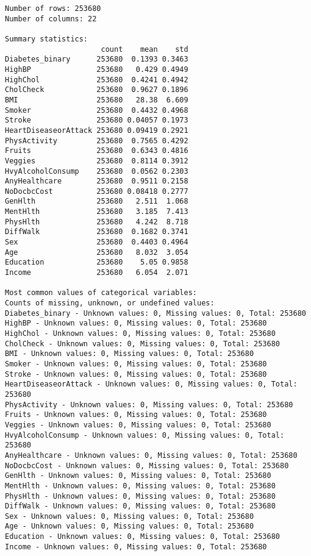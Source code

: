 \documentclass[11pt]{article}
\begin{document}
\begin{Verbatim}[tabsize=4]
Number of rows: 253680
Number of columns: 22

Summary statistics:
                      count    mean    std
Diabetes_binary      253680  0.1393 0.3463
HighBP               253680   0.429 0.4949
HighChol             253680  0.4241 0.4942
CholCheck            253680  0.9627 0.1896
BMI                  253680   28.38  6.609
Smoker               253680  0.4432 0.4968
Stroke               253680 0.04057 0.1973
HeartDiseaseorAttack 253680 0.09419 0.2921
PhysActivity         253680  0.7565 0.4292
Fruits               253680  0.6343 0.4816
Veggies              253680  0.8114 0.3912
HvyAlcoholConsump    253680  0.0562 0.2303
AnyHealthcare        253680  0.9511 0.2158
NoDocbcCost          253680 0.08418 0.2777
GenHlth              253680   2.511  1.068
MentHlth             253680   3.185  7.413
PhysHlth             253680   4.242  8.718
DiffWalk             253680  0.1682 0.3741
Sex                  253680  0.4403 0.4964
Age                  253680   8.032  3.054
Education            253680    5.05 0.9858
Income               253680   6.054  2.071

Most common values of categorical variables:
Counts of missing, unknown, or undefined values:
Diabetes_binary - Unknown values: 0, Missing values: 0, Total: 253680
HighBP - Unknown values: 0, Missing values: 0, Total: 253680
HighChol - Unknown values: 0, Missing values: 0, Total: 253680
CholCheck - Unknown values: 0, Missing values: 0, Total: 253680
BMI - Unknown values: 0, Missing values: 0, Total: 253680
Smoker - Unknown values: 0, Missing values: 0, Total: 253680
Stroke - Unknown values: 0, Missing values: 0, Total: 253680
HeartDiseaseorAttack - Unknown values: 0, Missing values: 0, Total: 253680
PhysActivity - Unknown values: 0, Missing values: 0, Total: 253680
Fruits - Unknown values: 0, Missing values: 0, Total: 253680
Veggies - Unknown values: 0, Missing values: 0, Total: 253680
HvyAlcoholConsump - Unknown values: 0, Missing values: 0, Total: 253680
AnyHealthcare - Unknown values: 0, Missing values: 0, Total: 253680
NoDocbcCost - Unknown values: 0, Missing values: 0, Total: 253680
GenHlth - Unknown values: 0, Missing values: 0, Total: 253680
MentHlth - Unknown values: 0, Missing values: 0, Total: 253680
PhysHlth - Unknown values: 0, Missing values: 0, Total: 253680
DiffWalk - Unknown values: 0, Missing values: 0, Total: 253680
Sex - Unknown values: 0, Missing values: 0, Total: 253680
Age - Unknown values: 0, Missing values: 0, Total: 253680
Education - Unknown values: 0, Missing values: 0, Total: 253680
Income - Unknown values: 0, Missing values: 0, Total: 253680

\end{Verbatim}
\end{document}
